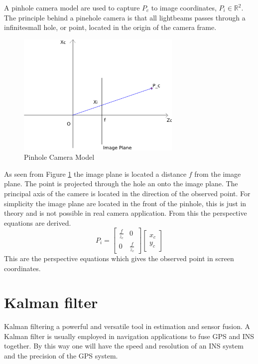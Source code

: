 	A pinhole camera model are used to capture $P_c$ to image coordinates, $P_i \in
	\mathbb{R}^2$. 
	The principle behind a pinehole camera is that all lightbeams passes through a
	infinitesmall hole, or point, located in the origin of the camera frame.   
	\begin{figure}[hbtp]
		\centering
		\includegraphics[width=0.7\textwidth]{pics/pinhole_model2}
		\caption{Pinhole Camera Model}
		\label{fig:ch1-pinhole}
	\end{figure}
			
	As seen from Figure \ref{fig:ch1-pinhole} the image plane is located a distance $f$ from the image plane. 
	The point is projected through the hole an onto the image plane. The principal axis of the camere is located
	in the direction of the observed point. For simplicity the image plane are located in the front of the
	pinhole, this is just in theory and is not possible in real camera application. From this the
	perspective equations are derived. \cite{robotbok}
	\begin{equation}
		\label{eq:ch1-perspective}
		P_i = \left[ \begin{array}{cc}
					\frac{f}{z_c} & 0 \\
					0	& \frac{f}{z_c} 
				\end{array} \right] 
				\left[ \begin{array}{c}
					x_c \\
					y_c
					\end{array} \right]
	\end{equation}
	This are the perspective equations which gives the observed point in screen coordinates. 

\section{Kalman filter}
	Kalman filtering a powerful and versatile tool in estimation and sensor fusion. A Kalman filter is
	usually employed in navigation applications to fuse GPS and INS together. By this way one will have
	the speed and resolution of an INS system and the precision of the GPS system.
	

